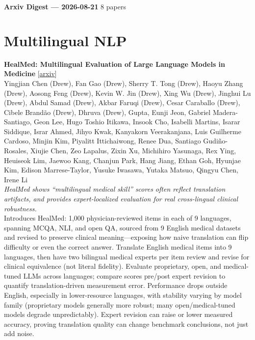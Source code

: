 \documentclass[12pt,letterpaper]{article}
\begin{document}
{\footnotesize\textbf{Arxiv Digest --- 2026-08-21} \hfill 8 papers}

\smallskip

\section*{Multilingual NLP}

{\small\textbf{HealMed: Multilingual Evaluation of Large Language Models in Medicine}} {\scriptsize[\href{https://arxiv.org/abs/2608.19981}{arxiv}]}\\
{\scriptsize Yingjian Chen (Drew), Fan Gao (Drew), Sherry T. Tong (Drew), Haoyu Zhang (Drew), Aosong Feng (Drew), Kevin W. Jin (Drew), Xing Wu (Drew), Jinghui Lu (Drew), Abdul Samad (Drew), Akbar Faruqi (Drew), Cesar Caraballo (Drew), Cibele Brand\~ao (Drew),  Dhruva (Drew),  Gupta, Eunji Jeon, Gabriel Madera-Santiago, Geon Lee, Hugo Toshio Itikawa, Insook Cho, Isabelli Martins, Isarar Siddique, Israr Ahmed, Jihyo Kwak, Kanyakorn Veerakanjana, Luis Guilherme Cardoso, Minjin Kim, Piyalitt Ittichaiwong, Renee Dua, Santiago Gudi\~no-Rosales, Xiujie Chen, Zeo Lapalus, Zixin Xu, Michihiro Yasunaga, Rex Ying, Heuiseok Lim, Jaewoo Kang, Chanjun Park, Hang Jiang, Ethan Goh, Hyunjae Kim, Edison Marrese-Taylor, Yusuke Iwasawa, Yutaka Matsuo, Qingyu Chen, Irene Li}\\

{\small\textit{HealMed shows ``multilingual medical skill'' scores often reflect translation artifacts, and provides expert-localized evaluation for real cross-lingual clinical robustness.}}\\[1pt]
{\footnotesize Introduces HealMed: 1,000 physician-reviewed items in each of 9 languages, spanning MCQA, NLI, and open QA, sourced from 9 English medical datasets and revised to preserve clinical meaning---exposing how naive translation can flip difficulty or even the correct answer. Translate English medical items into 9 languages, then have two bilingual medical experts per item review and revise for clinical equivalence (not literal fidelity). Evaluate proprietary, open, and medical-tuned LLMs across languages; compare scores pre/post expert revision to quantify translation-driven measurement error. Performance drops outside English, especially in lower-resource languages, with stability varying by model family (proprietary models generally more robust; many open/medical-tuned models degrade unpredictably). Expert revision can raise or lower measured accuracy, proving translation quality can change benchmark conclusions, not just add noise.}
\end{document}
